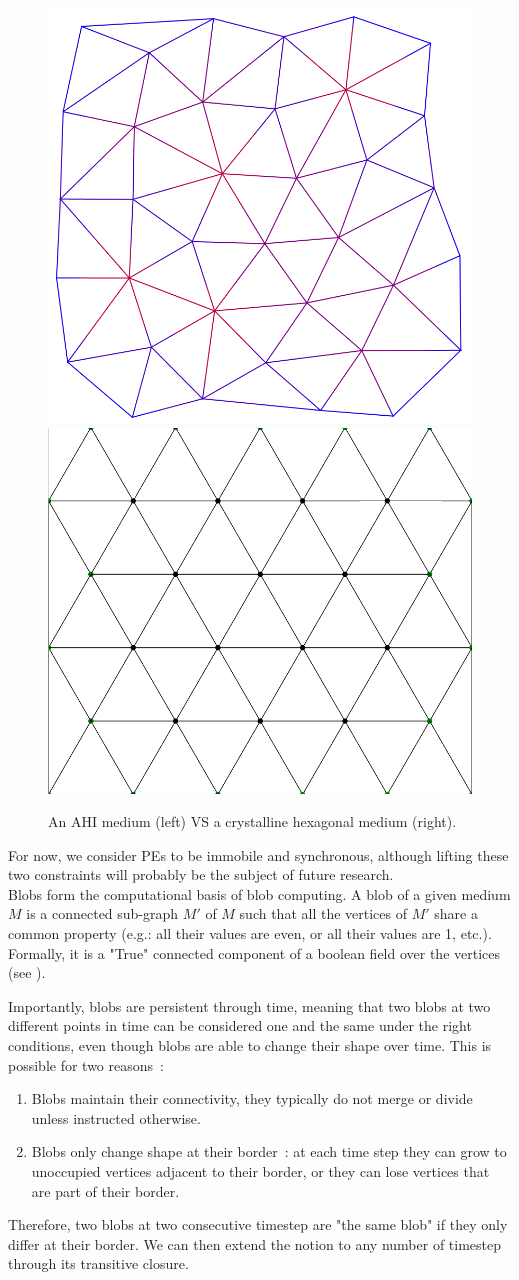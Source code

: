 \documentclass{article}
\begin{document}
\begin{figure}[h]
	\centering\includegraphics[width=0.4\linewidth]{assets/amorphous_medium.png}
	\hspace{0.1\linewidth}
	\centering\includegraphics[width=0.4\linewidth]{assets/hexagonal_medium.png}
	\caption{An AHI medium (left) VS a crystalline hexagonal medium (right).}
	\label{fig:amorphous_vs_crystaline}
\end{figure}

For now, we consider PEs to be immobile and synchronous, although lifting these two constraints will probably be the subject of future research.\\

Blobs form the computational basis of blob computing. A blob of a given medium $M$ is a connected sub-graph $M'$ of $M$ such that all the vertices of $M'$ share a common property (e.g.: all their values are even, or all their values are 1, etc.). Formally, it is a "True" connected component of a boolean field over the vertices (see \cite{Voronoi}).

Importantly, blobs are persistent through time, meaning that two blobs at two different points in time can be considered one and the same under the right conditions, even though blobs are able to change their shape over time. This is possible for two reasons~:
\begin{enumerate}
	\item Blobs maintain their connectivity, they typically do not merge or divide unless instructed otherwise.
	\item Blobs only change shape at their border~: at each time step they can grow to unoccupied vertices adjacent to their border, or they can lose vertices that are part of their border.
\end{enumerate}
Therefore, two blobs at two consecutive timestep are "the same blob" if they only differ at their border. We can then extend the notion to any number of timestep through its transitive closure.
\end{document}
